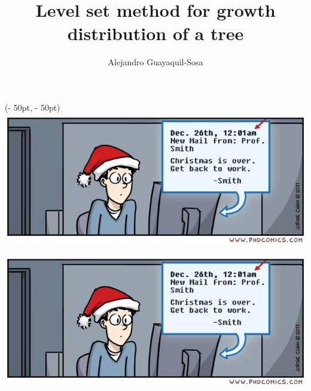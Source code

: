 {
\begin{textblock*}{\paperwidth}(\textwidth - 50pt, \textheight - 50pt)
\includegraphics[scale=0.5]{images/sampleteaser}\\
\hspace*{-0.75cm}\tiny{\cite{ref:main}}
\end{textblock*}
}

\usepackage{graphicx}
\usepackage{textpos}
\usepackage{color}

\title[Level set method for growth distribution of a tree]{Level set method for growth distribution of a tree}
\author[]{Alejandro Guayaquil-Sosa}
\date{}
\titlegraphic
{
\vspace*{-1.0cm}
\includegraphics[scale=1]{images/sampleteaser}\\
\medskip
\tiny{\cite{ref:main}}
}